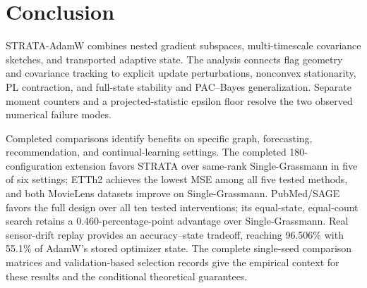 \section{Conclusion}
STRATA-AdamW combines nested gradient subspaces, multi-timescale covariance sketches, and transported adaptive state. The analysis connects flag geometry and covariance tracking to explicit update perturbations, nonconvex stationarity, PL contraction, and full-state stability and PAC--Bayes generalization. Separate moment counters and a projected-statistic epsilon floor resolve the two observed numerical failure modes.

Completed comparisons identify benefits on specific graph, forecasting, recommendation, and continual-learning settings. The completed 180-configuration extension favors STRATA over same-rank Single-Grassmann in five of six settings; ETTh2 achieves the lowest MSE among all five tested methods, and both MovieLens datasets improve on Single-Grassmann. PubMed/SAGE favors the full design over all ten tested interventions; its equal-state, equal-count search retains a 0.460-percentage-point advantage over Single-Grassmann. Real sensor-drift replay provides an accuracy--state tradeoff, reaching 96.506\% with 55.1\% of AdamW's stored optimizer state. The complete single-seed comparison matrices and validation-based selection records give the empirical context for these results and the conditional theoretical guarantees.
